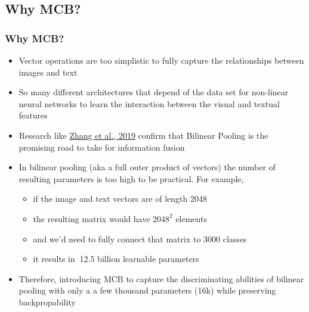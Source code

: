 \documentclass{beamer}
\begin{document}
\subsection{Why MCB?}
\begin{frame}
\frametitle{Why MCB?}
\begin{itemize}
\item Vector operations are too simplistic to fully capture the relationships between images and text
\item So many different architectures that depend of the data set for non-linear neural networks to learn the interaction between the visual and textual features
\item Research like \href{https://www.sciencedirect.com/science/article/pii/S1566253518308893}{\color{blue}Zhang et al., 2019} \color{black}confirm that Bilinear Pooling is the promising road to take for information fusion
\item In bilinear pooling (aka a full outer product of vectors)  the number of resulting parameters is too high to be practical. For example,
\begin{itemize}
\item if the image and text vectors are of length 2048
\item the resulting matrix would have \begin{math}2048^{2}\end{math} elements
\item and we’d need to fully connect that matrix to 3000 classes
\item it results in \begin{math}~\end{math}12.5 billion learnable parameters
\end{itemize}
\item Therefore, introducing MCB to capture the discriminating abilities of bilinear pooling with only a a few thousand parameters (16k) while preserving backpropability
\end{itemize}
\end{frame}

\end{document}
